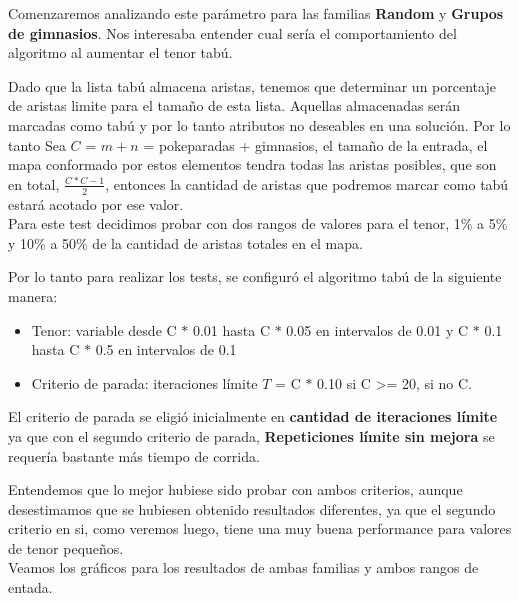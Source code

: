 Comenzaremos analizando este parámetro para las familias \textbf{Random} y \textbf{Grupos de gimnasios}.
Nos interesaba entender cual sería el comportamiento del algoritmo al aumentar el tenor tabú.

Dado que la lista tabú almacena aristas, tenemos que determinar un porcentaje de aristas limite para el tamaño de esta lista. Aquellas almacenadas serán marcadas como tabú y por lo tanto atributos no deseables en una solución.
Por lo tanto Sea $C$ = $m+n$ = pokeparadas + gimnasios, el tamaño de la entrada, el mapa conformado por estos elementos tendra todas las aristas posibles, que son en total, $\frac{C \ast C-1}{2}$, entonces la cantidad de aristas que podremos marcar como tabú estará acotado por ese valor.\\
Para este test decidimos probar con dos rangos de valores para el tenor, 1\% a 5\% y 10\% a 50\% de la cantidad de aristas totales en el mapa.

Por lo tanto para realizar los tests, se configuró el algoritmo tabú de la siguiente manera:

\begin{itemize}
\item Tenor: variable desde C $\ast$ 0.01 hasta C $\ast$ 0.05 en intervalos de 0.01 y C $\ast$ 0.1 hasta C $\ast$ 0.5 en intervalos de 0.1
\item Criterio de parada: iteraciones límite $T$ = C $\ast$ 0.10 si C >= 20, si no C.
\end{itemize}

El criterio de parada se eligió inicialmente en \textbf{cantidad de iteraciones límite} ya que con el segundo criterio de parada, \textbf{Repeticiones límite sin mejora} se requería bastante más tiempo de corrida. 

Entendemos que lo mejor hubiese sido probar con ambos criterios, aunque desestimamos que se hubiesen obtenido resultados diferentes, ya que el segundo criterio en si, como veremos luego, tiene una muy buena performance para valores de tenor pequeños.\\

Veamos los gráficos para los resultados de ambas familias y ambos rangos de entada.
\\\\

